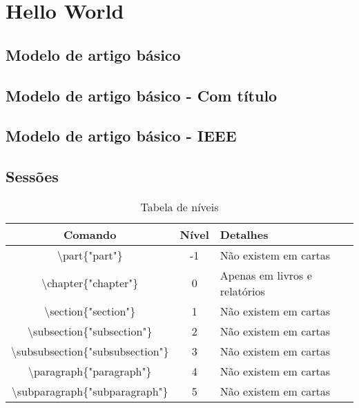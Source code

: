 \section{Hello World}

\subsection{Modelo de artigo básico}
\begin{frame}
	
\end{frame}

\subsection{Modelo de artigo básico - Com título}
\begin{frame}
	
\end{frame}

\subsection{Modelo de artigo básico - IEEE}
\begin{frame}
	
\end{frame}

\subsection{Sessões} %
\label{sub:sess_es}
\begin{frame}
	
\end{frame}

\begin{frame}
	\begin{table}[h]
	\begin{center}
	\begin{tabular}{|c|c|p{4cm}|}
		\hline
		\textbf{Comando} & \textbf{Nível} & \textbf{Detalhes} \\ \hline
		\textbackslash part\{"part"\} & -1 & Não existem em cartas \\ \hline
		\textbackslash chapter\{"chapter"\} & 0 & Apenas em livros e relatórios \\ \hline
		\textbackslash section\{"section"\} & 1 & Não existem em cartas \\ \hline
		\textbackslash subsection\{"subsection"\} & 2 & Não existem em cartas \\ \hline
		\textbackslash subsubsection\{"subsubsection"\} & 3 & Não existem em cartas \\ \hline
		\textbackslash paragraph\{"paragraph"\} & 4 & Não existem em cartas \\ \hline
		\textbackslash subparagraph\{"subparagraph"\} & 5 & Não existem em cartas \\ \hline
	\end{tabular}
	\end{center}
	\caption{Tabela de níveis}
	\label{}
	\end{table}
\end{frame}

